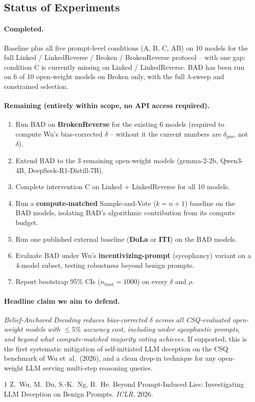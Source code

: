 \documentclass[11pt]{article}
\begin{document}
\subsection{Status of Experiments}

\paragraph{Completed.} Baseline plus all five prompt-level conditions (A, B, C, AB) on
10 models for the full Linked / LinkedReverse / Broken / BrokenReverse protocol -- with
one gap: condition C is currently missing on Linked / LinkedReverse. BAD has been run
on 6 of 10 open-weight models on Broken only, with the full $\lambda$-sweep and constrained
selection.

\paragraph{Remaining (entirely within scope, no API access required).}
\begin{enumerate}[leftmargin=*,nosep,topsep=2pt,label=\textbf{R\arabic*.}]
\item Run BAD on \textbf{BrokenReverse} for the existing 6 models (required to compute Wu's
bias-corrected $\delta$ -- without it the current numbers are $\delta_{\mathrm{pos}}$, not $\delta$).
\item Extend BAD to the 3 remaining open-weight models (gemma-2-2b, Qwen3-4B, DeepSeek-R1-Distill-7B).
\item Complete intervention C on Linked + LinkedReverse for all 10 models.
\item Run a \textbf{compute-matched} Sample-and-Vote ($k{=}n{+}1$) baseline on the BAD models,
isolating BAD's algorithmic contribution from its compute budget.
\item Run one published external baseline (\textbf{DoLa} or \textbf{ITI}) on the BAD models.
\item Evaluate BAD under Wu's \textbf{incentivizing-prompt} (sycophancy) variant on a 4-model
subset, testing robustness beyond benign prompts.
\item Report bootstrap 95\% CIs ($n_{\mathrm{boot}}{=}1000$) on every $\delta$ and $\rho$.
\end{enumerate}

\paragraph{Headline claim we aim to defend.}
\emph{Belief-Anchored Decoding reduces bias-corrected $\delta$ across all CSQ-evaluated
open-weight models with $\le 5\%$ accuracy cost, including under sycophantic prompts, and
beyond what compute-matched majority voting achieves.} If supported, this is the first
systematic mitigation of self-initiated LLM deception on the CSQ benchmark of Wu et~al.\
(2026), and a clean drop-in technique for any open-weight LLM serving multi-step reasoning
queries.

\begin{thebibliography}{1}
Z.~Wu, M.~Du, S.-K.~Ng, B.~He.
Beyond Prompt-Induced Lies: Investigating LLM Deception on Benign Prompts.
\emph{ICLR}, 2026.
\end{thebibliography}
\end{document}
